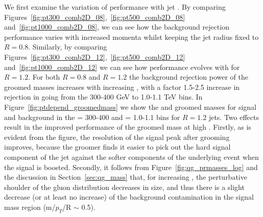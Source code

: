 We first examine the variation of performance with jet \pt. By comparing
Figures~\ref{fig:pt300_comb2D_08},~\ref{fig:pt500_comb2D_08}
and~\ref{fig:pt1000_comb2D_08}, we can see how the background
rejection performance varies with increased momenta whilst keeping the jet
radius fixed to $R=0.8$. Similarly, by comparing Figures~\ref{fig:pt300_comb2D_12},~\ref{fig:pt500_comb2D_12}
and~\ref{fig:pt1000_comb2D_12} we can see how performance evolves with
\pt for $R=1.2$. For both $R=0.8$ and $R=1.2$ the background rejection power of
the groomed masses increases with increasing \pt, with a factor 1.5-2.5 increase in rejection in going from the 300-400 GeV to
1.0-1.1 TeV bins. In Figure~\ref{fig:ptdepend_groomedmass} we show the
\msd and \mprun groomed masses for signal and background in the \pt = 300-400 and \pt = 1.0-1.1 \TeV bins for $R=1.2$ jets. Two effects result in the improved
performance of the groomed mass at high \pt. Firstly, as is evident
from the figure, the resolution of the signal peak after grooming
improves, because the groomer finds it easier to pick out the hard
signal component of the jet against the softer components of the
underlying event when the signal is boosted. Secondly, it follows
from Figure~\ref{fig:qg_prmasses_log} and the discussion in Section~\ref{sec:qg_mass}
that, for increasing \pt, the perturbative shoulder of the gluon
distribution decreases in size, and
thus there is a slight decrease (or at least no increase) of the background contamination in the
signal mass region (m/$p_{T}$/R $\sim$ 0.5). 

